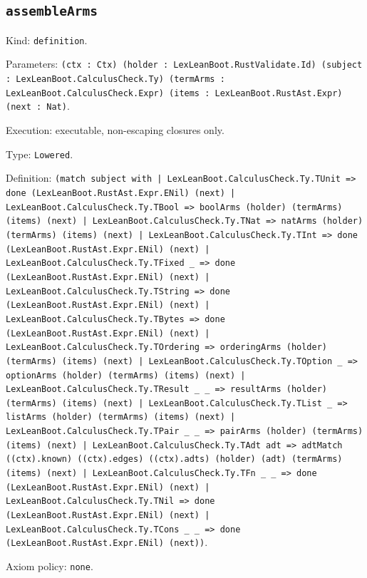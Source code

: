 \documentclass[11pt]{article}
\begin{document}
\subsection*{\texttt{assembleArms}}
\noindent Kind: \texttt{definition}.\par
\noindent Parameters: \texttt{(ctx : Ctx) (holder : LexLeanBoot.RustValidate.Id) (subject : LexLeanBoot.CalculusCheck.Ty) (termArms : LexLeanBoot.CalculusCheck.Expr) (items : LexLeanBoot.RustAst.Expr) (next : Nat)}.\par
\noindent Execution: executable, non-escaping closures only.\par
\noindent Type: \texttt{Lowered}.\par
\noindent Definition: \texttt{(match subject with | LexLeanBoot.CalculusCheck.Ty.TUnit => done (LexLeanBoot.RustAst.Expr.ENil) (next) | LexLeanBoot.CalculusCheck.Ty.TBool => boolArms (holder) (termArms) (items) (next) | LexLeanBoot.CalculusCheck.Ty.TNat => natArms (holder) (termArms) (items) (next) | LexLeanBoot.CalculusCheck.Ty.TInt => done (LexLeanBoot.RustAst.Expr.ENil) (next) | LexLeanBoot.CalculusCheck.Ty.TFixed \_ => done (LexLeanBoot.RustAst.Expr.ENil) (next) | LexLeanBoot.CalculusCheck.Ty.TString => done (LexLeanBoot.RustAst.Expr.ENil) (next) | LexLeanBoot.CalculusCheck.Ty.TBytes => done (LexLeanBoot.RustAst.Expr.ENil) (next) | LexLeanBoot.CalculusCheck.Ty.TOrdering => orderingArms (holder) (termArms) (items) (next) | LexLeanBoot.CalculusCheck.Ty.TOption \_ => optionArms (holder) (termArms) (items) (next) | LexLeanBoot.CalculusCheck.Ty.TResult \_ \_ => resultArms (holder) (termArms) (items) (next) | LexLeanBoot.CalculusCheck.Ty.TList \_ => listArms (holder) (termArms) (items) (next) | LexLeanBoot.CalculusCheck.Ty.TPair \_ \_ => pairArms (holder) (termArms) (items) (next) | LexLeanBoot.CalculusCheck.Ty.TAdt adt => adtMatch ((ctx).known) ((ctx).edges) ((ctx).adts) (holder) (adt) (termArms) (items) (next) | LexLeanBoot.CalculusCheck.Ty.TFn \_ \_ => done (LexLeanBoot.RustAst.Expr.ENil) (next) | LexLeanBoot.CalculusCheck.Ty.TNil => done (LexLeanBoot.RustAst.Expr.ENil) (next) | LexLeanBoot.CalculusCheck.Ty.TCons \_ \_ => done (LexLeanBoot.RustAst.Expr.ENil) (next))}.\par
\noindent Axiom policy: \texttt{none}.\par
\end{document}
